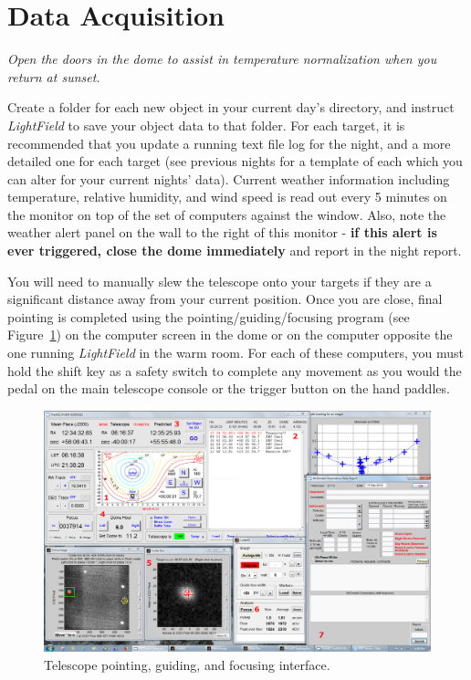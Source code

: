 \documentclass[12pt]{article}
\begin{document}
\section{Data Acquisition}\label{acquisition}
\textit{Open the doors in the dome to assist in temperature normalization when you return at sunset.}\par
Create a folder for each new object in your current day's directory, and instruct \textit{LightField} to save your object data to that folder. For each target, it is recommended that you update a running text file log for the night, and a more detailed one for each target (see previous nights for a template of each which you can alter for your current nights' data). Current weather information including temperature, relative humidity, and wind speed is read out every 5 minutes on the monitor on top of the set of computers against the window. Also, note the weather alert panel on the wall to the right of this monitor - \textbf{if this alert is ever triggered, close the dome immediately} and report in the night report.\par
\indent You will need to manually slew the telescope onto your targets if they are a significant distance away from your current position. Once you are close, final pointing is completed using the pointing/guiding/focusing program (see Figure~\ref{fig:point}) on the computer screen in the dome or on the computer opposite the one running \textit{LightField} in the warm room. For each of these computers, you must hold the shift key as a safety switch to complete any movement as you would the pedal on the main telescope console or the trigger button on the hand paddles.\par

\begin{figure}[!t]
   \centering
   \includegraphics[width=\textwidth]{pointing.png}
   \caption{Telescope pointing, guiding, and focusing interface.\label{fig:point}}
\end{figure}
\end{document}
